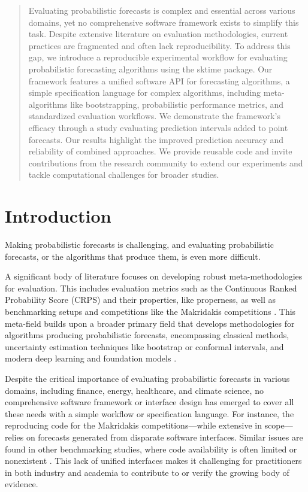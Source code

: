 
\begin{abstract}
Evaluating probabilistic forecasts is complex and essential across various domains, yet no comprehensive software framework exists to simplify this task. Despite extensive literature on evaluation methodologies, current practices are fragmented and often lack reproducibility. To address this gap, we introduce a reproducible experimental workflow for evaluating probabilistic forecasting algorithms using the sktime package. Our framework features a unified software API for forecasting algorithms, a simple specification language for complex algorithms, including meta-algorithms like bootstrapping, probabilistic performance metrics, and standardized evaluation workflows. We demonstrate the framework's efficacy through a study evaluating prediction intervals added to point forecasts. Our results highlight the improved prediction accuracy and reliability of combined approaches. We provide reusable code and invite contributions from the research community to extend our experiments and tackle computational challenges for broader studies.

\end{abstract}

\section{Introduction}\label{introduction}
Making probabilistic forecasts is challenging, and evaluating probabilistic forecasts, or the algorithms that produce them, is even more difficult.

A significant body of literature focuses on developing robust meta-methodologies for evaluation. This includes evaluation metrics such as the Continuous Ranked Probability Score (CRPS) \citep{gneiting2014probabilistic} and their properties, like properness, as well as benchmarking setups and competitions like the Makridakis competitions \citep{makridakis2020_m4, makridakis2022_m5}. This meta-field builds upon a broader primary field that develops methodologies for algorithms producing probabilistic forecasts, encompassing classical methods, uncertainty estimation techniques like bootstrap or conformal intervals, and modern deep learning and foundation models \citep{chen2020probabilistic, nowotarski2018probabilistic, lagllama, decoder_foundation_forecasting}.

Despite the critical importance of evaluating probabilistic forecasts in various domains, including finance, energy, healthcare, and climate science, no comprehensive software framework or interface design has emerged to cover all these needs with a simple workflow or specification language. For instance, the reproducing code for the Makridakis competitions—while extensive in scope—relies on forecasts generated from disparate software interfaces. Similar issues are found in other benchmarking studies, where code availability is often limited or nonexistent \citep{semmelrock2023, kiraly2018}. This lack of unified interfaces makes it challenging for practitioners in both industry and academia to contribute to or verify the growing body of evidence.

